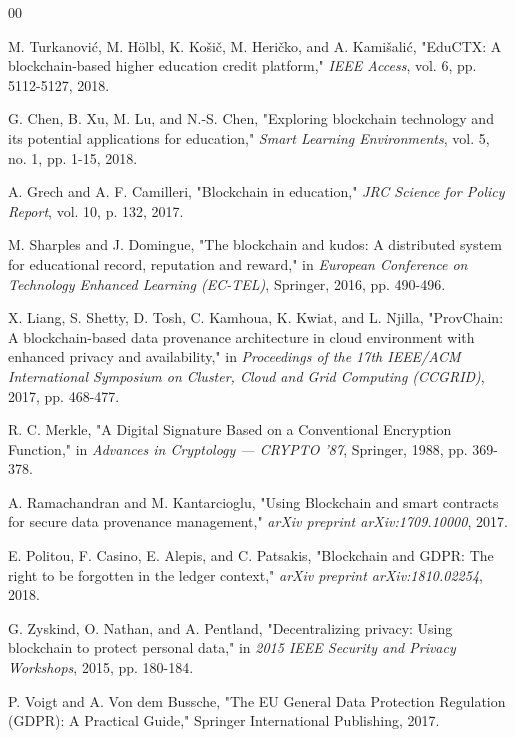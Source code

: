 \documentclass[conference]{IEEEtran}
\begin{document}
\begin{thebibliography}{00}

M. Turkanović, M. Hölbl, K. Košič, M. Heričko, and A. Kamišalić, 
"EduCTX: A blockchain-based higher education credit platform," 
\textit{IEEE Access}, vol. 6, pp. 5112-5127, 2018.

G. Chen, B. Xu, M. Lu, and N.-S. Chen, 
"Exploring blockchain technology and its potential applications for education," 
\textit{Smart Learning Environments}, vol. 5, no. 1, pp. 1-15, 2018.

A. Grech and A. F. Camilleri, 
"Blockchain in education," 
\textit{JRC Science for Policy Report}, vol. 10, p. 132, 2017.

M. Sharples and J. Domingue, 
"The blockchain and kudos: A distributed system for educational record, reputation and reward," 
in \textit{European Conference on Technology Enhanced Learning (EC-TEL)}, Springer, 2016, pp. 490-496.

X. Liang, S. Shetty, D. Tosh, C. Kamhoua, K. Kwiat, and L. Njilla, 
"ProvChain: A blockchain-based data provenance architecture in cloud environment with enhanced privacy and availability," 
in \textit{Proceedings of the 17th IEEE/ACM International Symposium on Cluster, Cloud and Grid Computing (CCGRID)}, 2017, pp. 468-477.

R. C. Merkle, 
"A Digital Signature Based on a Conventional Encryption Function," 
in \textit{Advances in Cryptology — CRYPTO ’87}, Springer, 1988, pp. 369-378.

A. Ramachandran and M. Kantarcioglu, 
"Using Blockchain and smart contracts for secure data provenance management," 
\textit{arXiv preprint arXiv:1709.10000}, 2017.

E. Politou, F. Casino, E. Alepis, and C. Patsakis, 
"Blockchain and GDPR: The right to be forgotten in the ledger context," 
\textit{arXiv preprint arXiv:1810.02254}, 2018.

G. Zyskind, O. Nathan, and A. Pentland, 
"Decentralizing privacy: Using blockchain to protect personal data," 
in \textit{2015 IEEE Security and Privacy Workshops}, 2015, pp. 180-184.

P. Voigt and A. Von dem Bussche, 
"The EU General Data Protection Regulation (GDPR): A Practical Guide," 
Springer International Publishing, 2017.


\end{thebibliography}
\end{document}
